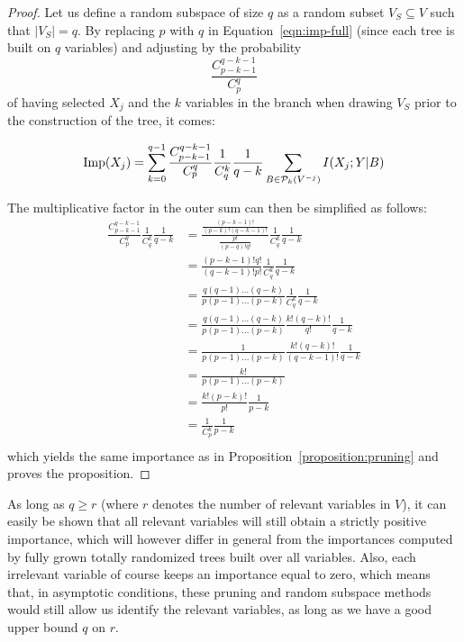 \begin{proof}
Let us define a random subspace of size $q$ as a random subset $V_S \subseteq V$
such that $|V_S|=q$. By replacing $p$ with $q$ in Equation~\ref{eqn:imp-full}
(since each tree is built on $q$ variables) and adjusting by the probability
$$\frac{C^{q-k-1}_{p-k-1}}{C^q_p}$$ of having selected $X_j$ and the $k$ variables in
the branch when drawing $V_S$ prior to the construction of the tree, it comes:

\begin{equation}
\text{Imp}(X_j)=\sum_{k=0}^{q-1} \frac{C^{q-k-1}_{p-k-1}}{C^q_p} \frac{1}{C_q^k} \frac{1}{q-k} \sum_{B \in {\cal P}_k(V^{-j})} I(X_j;Y|B)
\end{equation}

The multiplicative factor in the outer sum can then be simplified as follows:
\begin{align}
\frac{C^{q-k-1}_{p-k-1}}{C^q_p} \frac{1}{C_q^k} \frac{1}{q-k} &= \frac{\frac{(p-k-1)!}{(p-k)!(q-k-1)!}}{\frac{p!}{(p-q)!q!}} \frac{1}{C_q^k} \frac{1}{q-k}\nonumber\\
&= \frac{(p-k-1)!q!}{(q-k-1)!p!} \frac{1}{C_q^k} \frac{1}{q-k} \nonumber\\
&= \frac{q(q-1) ... (q-k)}{p(p-1) ... (p-k)} \frac{1}{C_q^k} \frac{1}{q-k}\nonumber\\
&= \frac{q(q-1) ... (q-k)}{p(p-1) ... (p-k)} \frac{k!(q-k)!}{q!} \frac{1}{q-k}\nonumber\\
&= \frac{1}{p(p-1) ... (p-k)} \frac{k!(q-k)!}{(q-k-1)!} \frac{1}{q-k}\nonumber\\
&= \frac{k!}{p(p-1) ... (p-k)}\nonumber \\
&= \frac{k!(p-k)!}{p!} \frac{1}{p-k} \nonumber\\
&= \frac{1}{C^k_p} \frac{1}{p-k} \nonumber\\
\end{align}
which  yields the same importance as in Proposition~\ref{proposition:pruning} and proves the
proposition.
\end{proof}

As long as $q  \geq r $ (where $r$ denotes the number of relevant variables in
$V$), it can easily be shown that all relevant variables will still obtain a
strictly positive importance, which will however differ in general from the
importances computed by fully grown totally randomized trees built over all
variables.  Also, each irrelevant variable of course keeps an importance equal
to zero, which means that, in asymptotic conditions, these pruning and random
subspace methods would still allow us identify the relevant  variables, as long
as we have a good upper bound $q$ on $r$.

